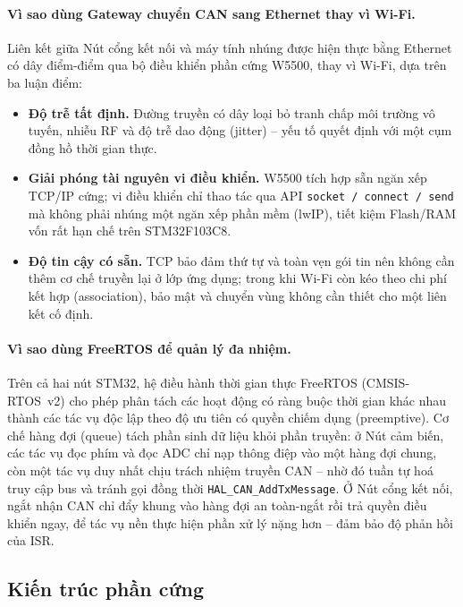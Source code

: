 \documentclass[../DoAn.tex]{subfiles}
\begin{document}
\paragraph{Vì sao dùng Gateway chuyển CAN sang Ethernet thay vì Wi-Fi.}
Liên kết giữa Nút cổng kết nối và máy tính nhúng được hiện thực bằng Ethernet
có dây điểm-điểm qua bộ điều khiển phần cứng W5500, thay vì Wi-Fi, dựa trên ba
luận điểm:
\begin{itemize}
  \item \textbf{Độ trễ tất định.} Đường truyền có dây loại bỏ tranh chấp môi
    trường vô tuyến, nhiễu RF và độ trễ dao động (jitter) -- yếu tố quyết định
    với một cụm đồng hồ thời gian thực.
  \item \textbf{Giải phóng tài nguyên vi điều khiển.} W5500 tích hợp sẵn ngăn
    xếp TCP/IP cứng; vi điều khiển chỉ thao tác qua API \texttt{socket / connect
    / send} mà không phải nhúng một ngăn xếp phần mềm (lwIP), tiết kiệm Flash/RAM
    vốn rất hạn chế trên STM32F103C8.
  \item \textbf{Độ tin cậy có sẵn.} TCP bảo đảm thứ tự và toàn vẹn gói tin nên
    không cần thêm cơ chế truyền lại ở lớp ứng dụng; trong khi Wi-Fi còn kéo theo
    chi phí kết hợp (association), bảo mật và chuyển vùng không cần thiết cho một
    liên kết cố định.
\end{itemize}

\paragraph{Vì sao dùng FreeRTOS để quản lý đa nhiệm.}
Trên cả hai nút STM32, hệ điều hành thời gian thực FreeRTOS (CMSIS-RTOS~v2) cho
phép phân tách các hoạt động có ràng buộc thời gian khác nhau thành các tác vụ
độc lập theo độ ưu tiên có quyền chiếm dụng (preemptive). Cơ chế hàng đợi
(queue) tách phần sinh dữ liệu khỏi phần truyền: ở Nút cảm biến, các tác vụ đọc
phím và đọc ADC chỉ nạp thông điệp vào một hàng đợi chung, còn một tác vụ duy
nhất chịu trách nhiệm truyền CAN -- nhờ đó tuần tự hoá truy cập bus và tránh
gọi đồng thời \texttt{HAL\_CAN\_AddTxMessage}. Ở Nút cổng kết nối, ngắt nhận
CAN chỉ đẩy khung vào hàng đợi an toàn-ngắt rồi trả quyền điều khiển ngay, để
tác vụ nền thực hiện phần xử lý nặng hơn -- đảm bảo độ phản hồi của ISR.

\subsection{Kiến trúc phần cứng}
\label{section:4.1.2}
\end{document}

